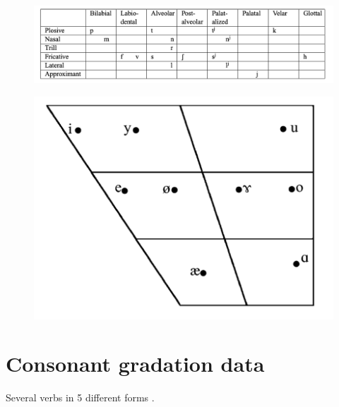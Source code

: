 \documentclass[a4paper, 12pt]{article}
\begin{document}
	\begin{figure}[H]
		\includegraphics[scale=.6]{est-consonants}
	\end{figure}
		
	\begin{figure}[H]
		\includegraphics[scale=.5]{est-vowels}
	\end{figure}

	\section{Consonant gradation data}
	
	Several verbs in 5 different forms \parencite{problems}.
\end{document}
